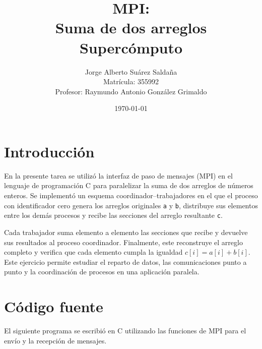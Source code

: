 \documentclass[12pt,a4paper]{article}
\title{
    MPI:\\[0.3em]
    \textbf{Suma de dos arreglos}\\[0.5em]
    \large Supercómputo
}
\author{
    Jorge Alberto Suárez Saldaña\\
    \small Matrícula: 355992\\
    \small Profesor: Raymundo Antonio González Grimaldo
}
\date{\today}
\begin{document}
\maketitle

\section{Introducción}

En la presente tarea se utilizó la interfaz de paso de mensajes (MPI) en el
lenguaje de programación C para paralelizar la suma de dos arreglos de números
enteros. Se implementó un esquema coordinador--trabajadores en el que el proceso
con identificador cero genera los arreglos originales \texttt{a} y \texttt{b},
distribuye sus elementos entre los demás procesos y recibe las secciones del
arreglo resultante \texttt{c}.

Cada trabajador suma elemento a elemento las secciones que recibe y devuelve
sus resultados al proceso coordinador. Finalmente, este reconstruye el arreglo
completo y verifica que cada elemento cumpla la igualdad
\(c[i]=a[i]+b[i]\). Este ejercicio permite estudiar el reparto de datos, las
comunicaciones punto a punto y la coordinación de procesos en una aplicación
paralela.

\section{Código fuente}

El siguiente programa se escribió en C utilizando las funciones de MPI para
el envío y la recepción de mensajes.
\end{document}
